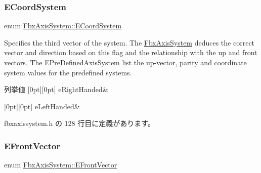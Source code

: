 \subsubsection{\texorpdfstring{E\+Coord\+System}{ECoordSystem}}
{\footnotesize\ttfamily enum \hyperlink{class_fbx_axis_system_a7cf0485846b560fa34f86932c02ec333}{Fbx\+Axis\+System\+::\+E\+Coord\+System}}

Specifies the third vector of the system. The \hyperlink{class_fbx_axis_system}{Fbx\+Axis\+System} deduces the correct vector and direction based on this flag and the relationship with the up and front vectors. The E\+Pre\+Defined\+Axis\+System list the up-\/vector, parity and coordinate system values for the predefined systems. \begin{DoxyEnumFields}{列挙値}
[0pt][0pt]{}\mbox{\label{class_fbx_axis_system_a7cf0485846b560fa34f86932c02ec333abdf1da85a4ef5a2d65c8d6271e3acf6d}} 
e\+Right\+Handed&\\
\hline

[0pt][0pt]{}\mbox{\label{class_fbx_axis_system_a7cf0485846b560fa34f86932c02ec333aecd32fe7557773b957f101f58840b387}} 
e\+Left\+Handed&\\
\hline

\end{DoxyEnumFields}


 fbxaxissystem.\+h の 128 行目に定義があります。

\mbox{\label{class_fbx_axis_system_a34bce1daad7ed6ae71916bb825d3ec87}} 
\subsubsection{\texorpdfstring{E\+Front\+Vector}{EFrontVector}}
{\footnotesize\ttfamily enum \hyperlink{class_fbx_axis_system_a34bce1daad7ed6ae71916bb825d3ec87}{Fbx\+Axis\+System\+::\+E\+Front\+Vector}}

